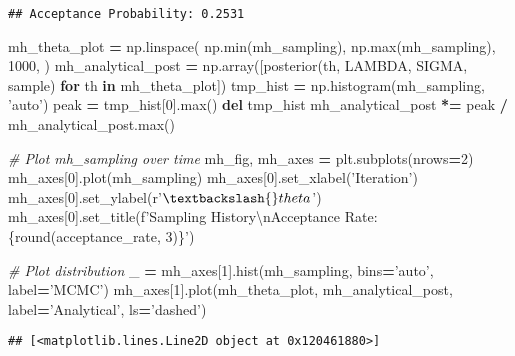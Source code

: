 \documentclass[]{article}
\newenvironment{Shaded}{\begin{snugshade}}{\end{snugshade}}
\newcommand{\BuiltInTok}[1]{#1}
\newcommand{\CharTok}[1]{\textcolor[rgb]{0.31,0.60,0.02}{#1}}
\newcommand{\CommentTok}[1]{\textcolor[rgb]{0.56,0.35,0.01}{\textit{#1}}}
\newcommand{\ControlFlowTok}[1]{\textcolor[rgb]{0.13,0.29,0.53}{\textbf{#1}}}
\newcommand{\DecValTok}[1]{\textcolor[rgb]{0.00,0.00,0.81}{#1}}
\newcommand{\KeywordTok}[1]{\textcolor[rgb]{0.13,0.29,0.53}{\textbf{#1}}}
\newcommand{\NormalTok}[1]{#1}
\newcommand{\OperatorTok}[1]{\textcolor[rgb]{0.81,0.36,0.00}{\textbf{#1}}}
\newcommand{\SpecialCharTok}[1]{\textcolor[rgb]{0.00,0.00,0.00}{#1}}
\newcommand{\SpecialStringTok}[1]{\textcolor[rgb]{0.31,0.60,0.02}{#1}}
\newcommand{\StringTok}[1]{\textcolor[rgb]{0.31,0.60,0.02}{#1}}
\newcommand{\VerbatimStringTok}[1]{\textcolor[rgb]{0.31,0.60,0.02}{#1}}
\begin{document}
\begin{verbatim}
## Acceptance Probability: 0.2531
\end{verbatim}

\begin{Shaded}
\begin{Highlighting}[]
\NormalTok{mh_theta_plot }\OperatorTok{=}\NormalTok{ np.linspace(}
\NormalTok{    np.}\BuiltInTok{min}\NormalTok{(mh_sampling),}
\NormalTok{    np.}\BuiltInTok{max}\NormalTok{(mh_sampling),}
    \DecValTok{1000}\NormalTok{,}
\NormalTok{)}
\NormalTok{mh_analytical_post }\OperatorTok{=}\NormalTok{ np.array([posterior(th, LAMBDA, SIGMA, sample) }\ControlFlowTok{for}\NormalTok{ th }\KeywordTok{in}\NormalTok{ mh_theta_plot])}
\NormalTok{tmp_hist }\OperatorTok{=}\NormalTok{ np.histogram(mh_sampling, }\StringTok{'auto'}\NormalTok{)}
\NormalTok{peak }\OperatorTok{=}\NormalTok{ tmp_hist[}\DecValTok{0}\NormalTok{].}\BuiltInTok{max}\NormalTok{()}
\KeywordTok{del}\NormalTok{ tmp_hist}
\NormalTok{mh_analytical_post }\OperatorTok{*=}\NormalTok{ peak }\OperatorTok{/}\NormalTok{ mh_analytical_post.}\BuiltInTok{max}\NormalTok{()}

\CommentTok{# Plot mh_sampling over time}
\NormalTok{mh_fig, mh_axes }\OperatorTok{=}\NormalTok{ plt.subplots(nrows}\OperatorTok{=}\DecValTok{2}\NormalTok{)}
\NormalTok{mh_axes[}\DecValTok{0}\NormalTok{].plot(mh_sampling)}
\NormalTok{mh_axes[}\DecValTok{0}\NormalTok{].set_xlabel(}\StringTok{'Iteration'}\NormalTok{)}
\NormalTok{mh_axes[}\DecValTok{0}\NormalTok{].set_ylabel(}\VerbatimStringTok{r'$\textbackslash{}theta$'}\NormalTok{)}
\NormalTok{mh_axes[}\DecValTok{0}\NormalTok{].set_title(}\SpecialStringTok{f'Sampling History}\CharTok{\textbackslash{}n}\SpecialStringTok{Acceptance Rate: }\SpecialCharTok{\{}\BuiltInTok{round}\NormalTok{(acceptance_rate, }\DecValTok{3}\NormalTok{)}\SpecialCharTok{\}}\SpecialStringTok{'}\NormalTok{)}

\CommentTok{# Plot distribution}
\NormalTok{_ }\OperatorTok{=}\NormalTok{ mh_axes[}\DecValTok{1}\NormalTok{].hist(mh_sampling, bins}\OperatorTok{=}\StringTok{'auto'}\NormalTok{, label}\OperatorTok{=}\StringTok{'MCMC'}\NormalTok{)}
\NormalTok{mh_axes[}\DecValTok{1}\NormalTok{].plot(mh_theta_plot, mh_analytical_post, label}\OperatorTok{=}\StringTok{'Analytical'}\NormalTok{, ls}\OperatorTok{=}\StringTok{'dashed'}\NormalTok{)}
\end{Highlighting}
\end{Shaded}

\begin{verbatim}
## [<matplotlib.lines.Line2D object at 0x120461880>]
\end{verbatim}
\end{document}
